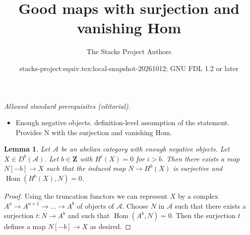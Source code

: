 \documentclass{stacks-project}
\title{Good maps with surjection and vanishing Hom}
\author{The Stacks Project Authors}
\date{stacks-project:equiv.tex:local-snapshot-20261012; GNU FDL 1.2 or later}
\theoremstyle{plain}
\newtheorem{lemma}[subsection]{Lemma}
\theoremstyle{definition}
\theoremstyle{remark}
\numberwithin{equation}{subsection}
\def\Hom{\mathop{\mathrm{Hom}}\nolimits}
\begin{document}
\maketitle
\noindent\textit{Allowed standard prerequisites (editorial).}\begin{itemize}
\item Enough negative objects. definition-level assumption of the statement. Provides N with the surjection and vanishing Hom.
\end{itemize}\medskip
\begin{lemma}
\label{lemma-good-map}
Let $\mathcal{A}$ be an abelian category with enough negative objects.
Let $X \in D^b(\mathcal{A})$. Let $b \in \mathbf{Z}$ with
$H^i(X) = 0$ for $i > b$. Then
there exists a map $N[-b] \to X$ such that the induced map
$N \to H^b(X)$ is surjective and $\Hom(H^b(X), N) = 0$.
\end{lemma}

\begin{proof}
Using the truncation functors we can represent $X$ by a complex
$A^a \to A^{a + 1} \to \ldots \to A^b$ of objects of $\mathcal{A}$.
Choose $N$ in $\mathcal{A}$ such that there exists a surjection
$t : N \to A^b$ and such that $\Hom(A^b, N) = 0$. Then the surjection $t$
defines a map $N[-b] \to X$ as desired.
\end{proof}
\end{document}
